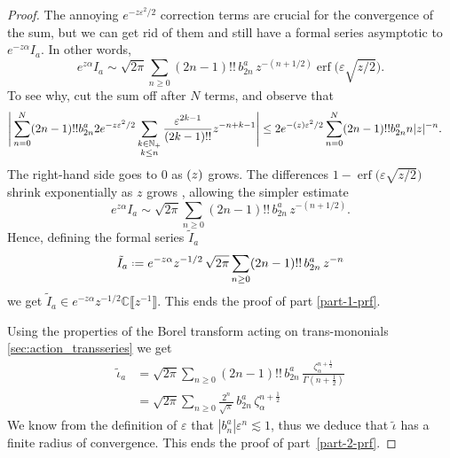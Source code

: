 \documentclass{article}
\let\Re\relax
\DeclareMathOperator{\Re}{Re}
\newcommand{\C}{\mathbb{C}}
\newcommand{\series}[1]{\tilde{#1}}
\newcommand*{\defeq}{\mathrel{\vcenter{\baselineskip0.5ex \lineskiplimit0pt
                     \hbox{\scriptsize.}\hbox{\scriptsize.}}}%
                     =}
\theoremstyle{definition}
\theoremstyle{plain}
\begin{document}
\begin{proof}
The annoying $e^{-z\varepsilon^2/2}$ correction terms are crucial for the convergence of the sum, but we can get rid of them and still have a formal series asymptotic to $e^{-z \alpha} I_a$. In other words,
\[ e^{z \alpha} I_a \sim \sqrt{2\pi} \sum_{n \ge 0} (2n-1)!!\,b_{2n}^a\,z^{-(n+1/2)} \operatorname{erf}\big(\varepsilon \sqrt{z/2}\big). \]
To see why, cut the sum off after $N$ terms, and observe that
\begin{align*}
  \Bigg | \sum_{n= 0}^N(2n-1)!! b_{2n}^a  2e^{-z\varepsilon^2/2} \sum_{\substack{k \in \mathbb{N}_+ \\ k \le n}} \frac{\varepsilon^{2k-1}}{(2k-1)!!} z^{-n+k-1} \Bigg | &\leq  2 e^{-\Re (z) \varepsilon^2/2} \sum_{n=0}^N(2n-1)!! b_{2n}^a n|z|^{-n}.
\end{align*}
The right-hand side goes to $0$ as $\Re(z)$ grows. The differences $1 - \operatorname{erf}\big(\varepsilon \sqrt{z/2}\big)$ shrink exponentially as $z$ grows \cite[inequality~5]{chiani-dardari-book}, allowing the simpler estimate
\[ e^{z\alpha} I_a \sim \sqrt{2\pi} \sum_{n \ge 0} (2n-1)!!\, b_{2n}^a \,z^{-(n+1/2)}. \]
Hence, defining the formal series $\series{I}_a$
\[\series{I}_a \defeq e^{-z\alpha} z^{-1/2}\, \sqrt{2\pi} \sum_{n \ge 0} (2n-1)!!\, b_{2n}^a \,z^{-n}\]
we get $\series{I}_a \in e^{-z\alpha}z^{-1/2}\C\llbracket z^{-1}\rrbracket$. This ends the proof of part \ref{part-1-prf}.

Using the properties of the Borel transform acting on trans-mononials \ref{sec:action_transseries} we get 
\begin{align*}
\series{\iota}_a & = \sqrt{2\pi} \sum_{n \ge 0} (2n - 1)!! \,b_{2n}^a\,\frac{\zeta_\alpha^{n+\tfrac{1}{2}}}{\Gamma(n+\tfrac{1}{2})} \\
&= \sqrt{2\pi} \sum_{n \ge 0} \frac{2^n}{\sqrt{\pi}} \,b_{2n}^a\,\zeta_\alpha^{n+\tfrac{1}{2}}
\end{align*}
We know from the definition of $\varepsilon$ that $\left|b_n^a\right| \varepsilon^n \lesssim 1$, thus we deduce that $\series{\iota}$ has a finite radius of convergence. This ends the proof of part~\ref{part-2-prf}.


\end{proof}
\end{document}
